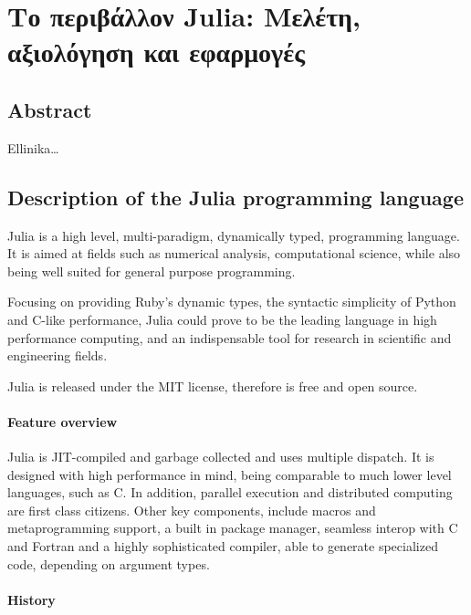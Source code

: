 \documentclass[]{article}
\date{}
\let\oldparagraph\paragraph
\renewcommand{\paragraph}[1]{\oldparagraph{#1}\mbox{}}
\begin{document}
\section{Το περιβάλλον Julia: Μελέτη, αξιολόγηση και
εφαρμογές}\label{ux3c4ux3bf-ux3c0ux3b5ux3c1ux3b9ux3b2ux3acux3bbux3bbux3bfux3bd-julia-ux3bcux3b5ux3bbux3adux3c4ux3b7-ux3b1ux3beux3b9ux3bfux3bbux3ccux3b3ux3b7ux3c3ux3b7-ux3baux3b1ux3b9-ux3b5ux3c6ux3b1ux3c1ux3bcux3bfux3b3ux3adux3c2}

\subsection{Abstract}\label{abstract}

Ellinika\ldots{}

\subsection{Description of the Julia programming
language}\label{description-of-the-julia-programming-language}

Julia is a high level, multi-paradigm, dynamically typed, programming
language. It is aimed at fields such as numerical analysis,
computational science, while also being well suited for general purpose
programming.

Focusing on providing Ruby's dynamic types, the syntactic simplicity of
Python and C-like performance, Julia could prove to be the leading
language in high performance computing, and an indispensable tool for
research in scientific and engineering fields.

Julia is released under the MIT license, therefore is free and open
source.

\paragraph{Feature overview}\label{feature-overview}

Julia is JIT-compiled and garbage collected and uses multiple dispatch.
It is designed with high performance in mind, being comparable to much
lower level languages, such as C. In addition, parallel execution and
distributed computing are first class citizens. Other key components,
include macros and metaprogramming support, a built in package manager,
seamless interop with C and Fortran and a highly sophisticated compiler,
able to generate specialized code, depending on argument types.

\paragraph{History}\label{history}
\end{document}

